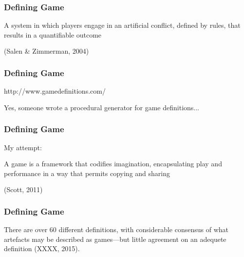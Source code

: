 \begin{frame}
	\frametitle{Defining Game}
		
	\begin{center}
	\begin{huge}
	A system in which players engage in an artificial conflict, defined by rules, that results in a quantifiable outcome
	\end{huge}
	
	\vspace{3em}
	
	(Salen \& Zimmerman, 2004)
	\end{center}

\end{frame}

\begin{frame}
	\frametitle{Defining Game}
		
	\begin{center}
	\begin{huge}
	http://www.gamedefinitions.com/
	\end{huge}
	\end{center}
	
	\vspace{3em}
	
	\begin{small}
	Yes, someone wrote a procedural generator for game definitions...
	\end{small}
	
\end{frame}

\begin{frame}
	\frametitle{Defining Game}
	
	My attempt:
		
	\begin{center}
	\begin{huge}
	A game is a framework that codifies imagination, encapsulating play and performance in a way that permits copying and sharing
	\end{huge}
	
	\vspace{3em}
	
	(Scott, 2011)
	\end{center}

\end{frame}

\begin{frame}
	\frametitle{Defining Game}
	
	There are over 60 different definitions, with considerable consensus of what artefacts may be described as games---but little agreement on an adequete definition (XXXX, 2015).

\end{frame}


